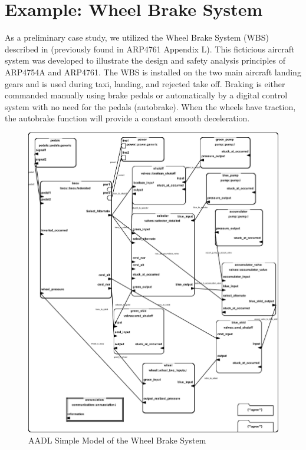 \section{Example: Wheel Brake System}


As a preliminary case study, we utilized the Wheel Brake System (WBS) described in \cite{AIR6110} (previously found in ARP4761 Appendix L). This ficticious aircraft system was developed to illustrate the design and safety analysis principles of ARP4754A and ARP4761.  The WBS is installed on the two main aircraft landing gears and is used during taxi, landing, and rejected take off. Braking is either commanded manually using brake pedals or automatically by a digital control system with no need for the pedals (autobrake). When the wheels have traction, the autobrake function will provide a constant smooth deceleration.

\begin{figure}
\begin{center}
\includegraphics[width=\textwidth]{images/wbsfederated3.jpg}
\caption{AADL Simple Model of the Wheel Brake System }
\label{fig:wbs_ima}
\end{center}
\end{figure}

